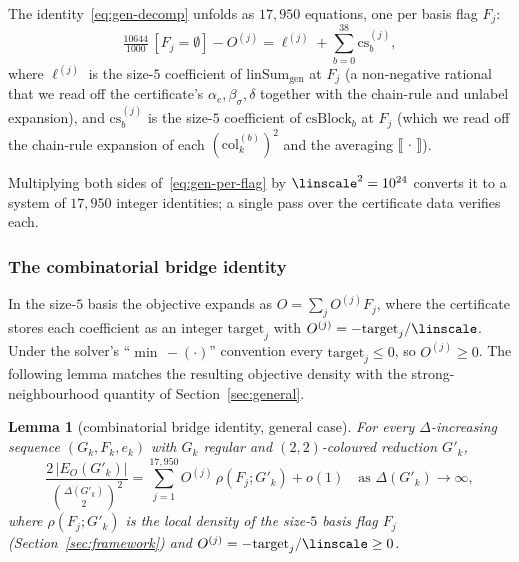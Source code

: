 \documentclass[11pt,a4paper]{article}
\newtheorem{lemma}[theorem]{Lemma}
\theoremstyle{definition}
\theoremstyle{remark}
\begin{document}
The identity~\eqref{eq:gen-decomp} unfolds as $17{,}950$ equations,
one per basis flag $F_j$:
\begin{equation}
\label{eq:gen-per-flag}
\tfrac{10644}{1000}\,[F_j = \emptyset]
- O^{(j)}
= \ell^{(j)} + \sum_{b = 0}^{38} \mathrm{cs}^{(j)}_b,
\end{equation}
where $\ell^{(j)}$ is the size-$5$ coefficient of
$\mathrm{linSum}_{\mathrm{gen}}$ at $F_j$ (a non-negative rational
that we read off the certificate's $\alpha_e, \beta_\sigma, \delta$ together
with the chain-rule and unlabel expansion), and $\mathrm{cs}^{(j)}_b$
is the size-$5$ coefficient of $\mathrm{csBlock}_b$ at $F_j$ (which we
read off the chain-rule expansion of each
$(\mathrm{col}_k^{(b)})^2$ and the averaging $\llbracket\,
\cdot\,\rrbracket$).

Multiplying both sides of~\eqref{eq:gen-per-flag} by
$\linscale^2 = 10^{24}$ converts it to a system of $17{,}950$
integer identities; a single pass over the certificate data verifies each.

\subsubsection{The combinatorial bridge identity}

In the size-$5$ basis the objective expands as
$O = \sum_j O^{(j)} F_j$, where the certificate stores each coefficient
as an integer $\mathrm{target}_j$ with
$O^{(j)} = -\mathrm{target}_j / \linscale$. Under the solver's
``$\min\,{-}(\cdot)$'' convention every $\mathrm{target}_j \leq 0$, so
$O^{(j)} \geq 0$. The following lemma matches the resulting objective
density with the strong-neighbourhood quantity of
Section~\ref{sec:general}.

\begin{lemma}[combinatorial bridge identity, general case]
\label{lem:cbi-gen}
For every $\Delta$-increasing sequence $(G_k, F_k, e_k)$
with $G_k$ regular and $(2,2)$-coloured reduction $G'_k$,
\[
\frac{2\,|E_O(G'_k)|}{\binom{\Delta(G'_k)}{2}^2}
= \sum_{j = 1}^{17{,}950} O^{(j)}\,\rho(F_j; G'_k)
+ o(1)
\quad\text{as }\Delta(G'_k) \to \infty,
\]
where $\rho(F_j; G'_k)$ is the local density of the size-$5$ basis flag
$F_j$ (Section~\ref{sec:framework}) and
$O^{(j)} = -\mathrm{target}_j / \linscale \geq 0$.
\end{lemma}
\end{document}
